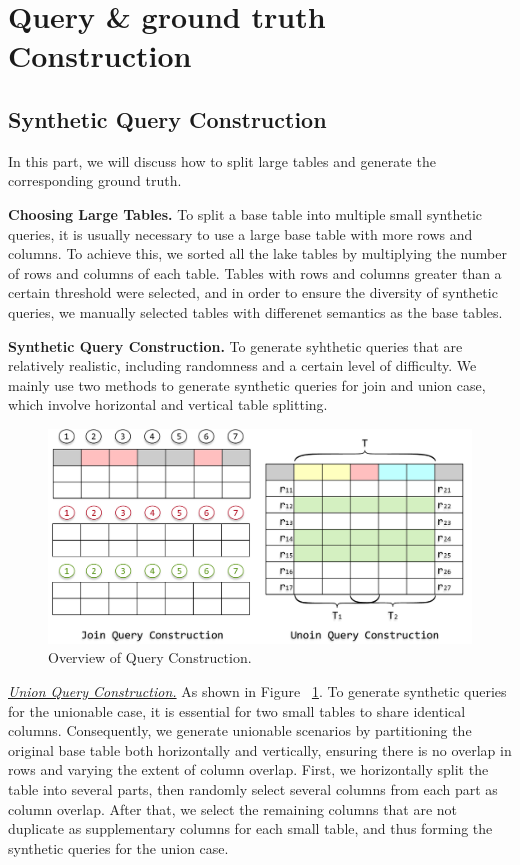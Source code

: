 \section{Query \& ground truth Construction}

\subsection{Synthetic Query Construction}
In this part, we will discuss how to split large tables and generate the corresponding ground truth.

\noindent \textbf{Choosing Large Tables.} 
To split a base table into multiple small synthetic queries, it is usually necessary to use a large base table with more rows and columns. To achieve this, we sorted all the lake tables by multiplying the number of rows and columns of each table. Tables with rows and columns greater than a certain threshold were selected, and in order to ensure the diversity of synthetic queries, we manually selected tables with differenet semantics as the base tables.

\noindent \textbf{Synthetic Query Construction.} 
To generate syhthetic queries that are relatively realistic, including randomness and a certain level of difficulty. We mainly use two methods to generate synthetic queries for join and union case, which involve horizontal and vertical table splitting. 

\begin{figure}[h]
	\centering
	\includegraphics[width=1\linewidth]{fig/fake_query.pdf}
	\caption{Overview of Query Construction.}
	\label{fig:query_construction}
\end{figure}


\noindent \underline{\textit{Union Query Construction.}}  As shown in Figure ~\ref{fig:query_construction}. To generate synthetic queries for the unionable case, it is essential for two small tables to share identical columns. Consequently, we generate unionable scenarios by partitioning the original base table both horizontally and vertically, ensuring there is no overlap in rows and varying the extent of column overlap. First, we horizontally split the table into several parts, then randomly select several columns from each part as column overlap. After that, we select the remaining columns that are not duplicate as supplementary columns for each small table, and thus forming the synthetic queries for the union case.

